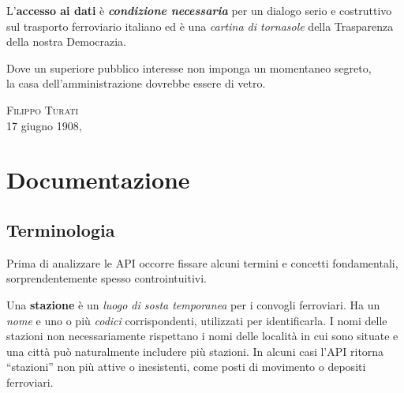 \documentclass[12pt,a4paper,italian]{report}
\begin{document}
L'\textbf{accesso ai dati} è \textit{\textbf{condizione necessaria}}
per un dialogo serio e costruttivo sul trasporto ferroviario italiano
ed è una \textit{cartina di tornasole} della Trasparenza della nostra
Democrazia.

\pagebreak

\vspace*{\fill}

\begin{center}
    \begin{minipage}[t]{0.90\linewidth}
        \renewcommand{\epigraphflush}{center}
        \renewcommand{\sourceflush}{center}
        \setlength\epigraphwidth{\linewidth}
        
        \epigraph{%
            \centering Dove un superiore pubblico interesse non imponga un
            momentaneo segreto, \\la casa dell'amministrazione dovrebbe
            essere di vetro.
        }{\textsc{Filippo Turati} \\17 giugno 1908,~\cite{Turati} }
    \end{minipage}
\end{center}

\vspace*{\fill}


\renewcommand*{\bibfont}{\small}
\printbibliography


\appendix

\chapter{Documentazione}
\label{documentazione}

\section{Terminologia}
\label{terminologia}

Prima di analizzare le API occorre fissare alcuni termini e concetti
fondamentali, sorprendentemente spesso controintuitivi.

Una \textbf{stazione} è un \textit{luogo di sosta temporanea} per i
convogli ferroviari.  Ha un \textit{nome} e uno o più \textit{codici}
corrispondenti, utilizzati per identificarla.  I nomi delle stazioni
non necessariamente rispettano i nomi delle località in cui sono
situate e una città può naturalmente includere più stazioni.  In
alcuni casi l'API ritorna ``stazioni'' non più attive o inesistenti,
come posti di movimento o depositi ferroviari.
\end{document}
